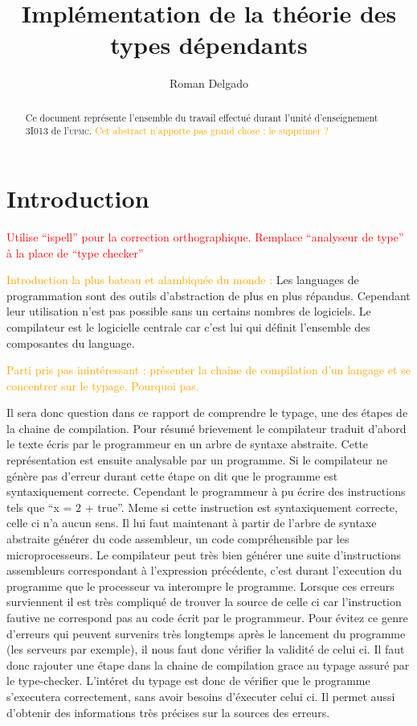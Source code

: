 \documentclass {article}
\title{Implémentation de la théorie des types dépendants}
\author{Roman Delgado}
\date{}
\theoremstyle{definition}
\theoremstyle{remark}
\newcommand{\todo}[1]{\textcolor{red}{#1}}
\newcommand{\attention}[1]{\textcolor{orange}{#1}}
\begin{document}
\maketitle




\begin{abstract} 
  Ce document représente l'ensemble du travail effectué durant l'unité d'enseignement 3I013 de l'\textsc{upmc}. \attention{Cet abstract n'apporte pas grand chose : le supprimer ?}
\end{abstract}

\setcounter{tocdepth}{2}
\tableofcontents

\clearpage


\section{Introduction}

\todo{Utilise ``ispell'' pour la correction orthographique.}
\todo{Remplace ``analyseur de type'' à la place de ``type checker''}

\attention{Introduction la plus bateau et alambiquée du monde :} Les languages de programmation sont des outils d'abstraction de plus en plus répandus. Cependant leur utilisation n'est pas possible 
sans un certains nombres de logiciels. Le compilateur est le logicielle centrale car c'est lui qui définit l'ensemble des 
composantes du language.

\attention{Parti pris pas inintéressant : présenter la chaîne de
  compilation d'un langage et se concentrer sur le typage. Pourquoi
  pas.}

Il sera donc question dans ce rapport de comprendre le typage, une des étapes de la chaine de compilation.
Pour résumé brievement le compilateur 
traduit d'abord le texte écris par le programmeur en un arbre de syntaxe abstraite. Cette représentation est ensuite analysable 
par un programme. %
Si le compilateur ne génère pas d'erreur durant cette étape on dit que le programme est syntaxiquement correcte. Cependant 
le programmeur à pu écrire des instructions tels que ``x = 2 + true''. Meme si cette instruction est syntaxiquement correcte, celle ci 
n'a aucun sens. Il lui faut maintenant à partir de l'arbre de syntaxe abstraite générer du code assembleur, un code compréhensible 
par les microprocesseurs. Le compilateur peut très bien générer une suite d'instructions assembleurs correspondant à l'expression 
précédente, c'est durant l'execution du programme que le processeur va interompre le programme. Lorsque ces erreurs surviennent il est 
très compliqué de trouver la source de celle ci car l'instruction fautive ne correspond pas au code écrit par le programmeur. 
Pour évitez ce genre d'erreurs qui peuvent survenirs très longtemps après le lancement du programme (les serveurs par exemple), 
il nous faut donc vérifier la validité de celui ci. Il faut donc rajouter une étape dans la chaine de compilation grace au typage 
assuré par le type-checker.
L'intéret du typage est donc de vérifier que le programme s'executera correctement, sans avoir besoins d'éxecuter celui ci. 
Il permet aussi d'obtenir des informations très précises sur la sources des erreurs.
\end{document}

